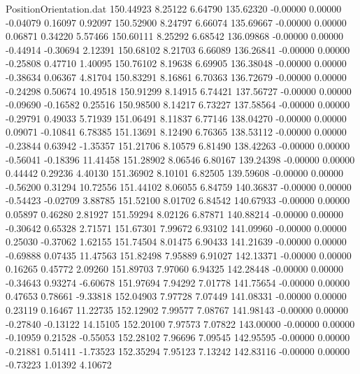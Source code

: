 \begin{filecontents}{PositionOrientation.dat}
 150.44923    8.25122    6.64790   135.62320   -0.00000    0.00000   -0.04079    0.16097    0.92097
 150.52900    8.24797    6.66074   135.69667   -0.00000    0.00000    0.06871    0.34220    5.57466
 150.60111    8.25292    6.68542   136.09868   -0.00000    0.00000   -0.44914   -0.30694    2.12391
 150.68102    8.21703    6.66089   136.26841   -0.00000    0.00000   -0.25808    0.47710    1.40095
 150.76102    8.19638    6.69905   136.38048   -0.00000    0.00000   -0.38634    0.06367    4.81704
 150.83291    8.16861    6.70363   136.72679   -0.00000    0.00000   -0.24298    0.50674   10.49518
 150.91299    8.14915    6.74421   137.56727   -0.00000    0.00000   -0.09690   -0.16582    0.25516
 150.98500    8.14217    6.73227   137.58564   -0.00000    0.00000   -0.29791    0.49033    5.71939
 151.06491    8.11837    6.77146   138.04270   -0.00000    0.00000    0.09071   -0.10841    6.78385
 151.13691    8.12490    6.76365   138.53112   -0.00000    0.00000   -0.23844    0.63942   -1.35357
 151.21706    8.10579    6.81490   138.42263   -0.00000    0.00000   -0.56041   -0.18396   11.41458
 151.28902    8.06546    6.80167   139.24398   -0.00000    0.00000    0.44442    0.29236    4.40130
 151.36902    8.10101    6.82505   139.59608   -0.00000    0.00000   -0.56200    0.31294   10.72556
 151.44102    8.06055    6.84759   140.36837   -0.00000    0.00000   -0.54423   -0.02709    3.88785
 151.52100    8.01702    6.84542   140.67933   -0.00000    0.00000    0.05897    0.46280    2.81927
 151.59294    8.02126    6.87871   140.88214   -0.00000    0.00000   -0.30642    0.65328    2.71571
 151.67301    7.99672    6.93102   141.09960   -0.00000    0.00000    0.25030   -0.37062    1.62155
 151.74504    8.01475    6.90433   141.21639   -0.00000    0.00000   -0.69888    0.07435   11.47563
 151.82498    7.95889    6.91027   142.13371   -0.00000    0.00000    0.16265    0.45772    2.09260
 151.89703    7.97060    6.94325   142.28448   -0.00000    0.00000   -0.34643    0.93274   -6.60678
 151.97694    7.94292    7.01778   141.75654   -0.00000    0.00000    0.47653    0.78661   -9.33818
 152.04903    7.97728    7.07449   141.08331   -0.00000    0.00000    0.23119    0.16467   11.22735
 152.12902    7.99577    7.08767   141.98143   -0.00000    0.00000   -0.27840   -0.13122   14.15105
 152.20100    7.97573    7.07822   143.00000   -0.00000    0.00000   -0.10959    0.21528   -0.55053
 152.28102    7.96696    7.09545   142.95595   -0.00000    0.00000   -0.21881    0.51411   -1.73523
 152.35294    7.95123    7.13242   142.83116   -0.00000    0.00000   -0.73223    1.01392    4.10672

\end{filecontents}
